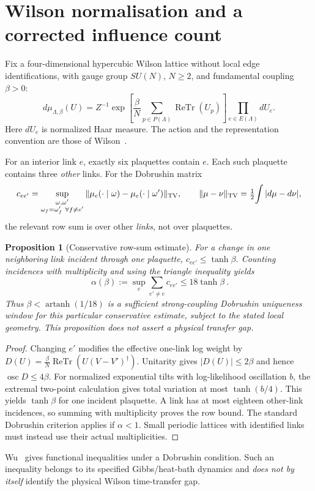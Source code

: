 \documentclass[11pt,a4paper]{article}
\newtheorem{proposition}[theorem]{Proposition}
\theoremstyle{remark}
\begin{document}
\section{Wilson normalisation and a corrected influence count}
Fix a four-dimensional hypercubic Wilson lattice without local
edge identifications, with gauge group $SU(N)$, $N\ge2$, and
fundamental coupling $\beta>0$:
\[
d\mu_{\Lambda,\beta}(U)=
Z^{-1}\exp\left[
  \frac{\beta}{N}\sum_{p\in P(\Lambda)}
      \operatorname{ReTr}(U_p)
\right]\prod_{e\in E(\Lambda)}dU_e.
\]
Here $dU_e$ is normalized Haar measure.
The action and the representation convention are those of
Wilson~\cite{Wilson}.

For an interior link $e$, exactly six plaquettes contain $e$.
Each such plaquette contains three \emph{other} links.
For the Dobrushin matrix
\[
c_{ee'}=\sup_{\substack{\omega,\omega'\\
\omega_f=\omega'_f\ \forall f\ne e'}}
\|\mu_e(\cdot\mid\omega)-\mu_e(\cdot\mid\omega')\|_{\rm TV},
\qquad \|\mu-\nu\|_{\rm TV}=\tfrac12\!\int|d\mu-d\nu|,
\]
the relevant row sum is over other \emph{links}, not over
plaquettes.

\begin{proposition}[Conservative row-sum estimate]\label{prop:count}
For a change in one neighboring link incident through one
plaquette, $c_{ee'}\le\tanh\beta$.
Counting incidences with multiplicity and using the triangle
inequality yields
\[
\boxed{\ \alpha(\beta):=\sup_e\sum_{e'\ne e}c_{ee'}
\le18\tanh\beta\ }.
\]
Thus $\beta<\operatorname{artanh}(1/18)$ is a sufficient
strong-coupling \emph{Dobrushin uniqueness} window for this
particular conservative estimate, subject to the stated local
geometry. This proposition does not assert a physical transfer gap.
\end{proposition}
\begin{proof}
Changing $e'$ modifies the effective one-link log weight by
$D(U)=\frac{\beta}{N}\operatorname{ReTr}(U(V-V')^\dagger)$.
Unitarity gives $|D(U)|\le2\beta$ and hence
$\operatorname{osc}D\le4\beta$.
For normalized exponential tilts with log-likelihood oscillation
$b$, the extremal two-point calculation gives total variation at
most $\tanh(b/4)$. This yields $\tanh\beta$ for one incident
plaquette. A link has at most eighteen other-link incidences, so
summing with multiplicity proves the row bound.
The standard Dobrushin criterion applies if $\alpha<1$.
Small periodic lattices with identified links must instead
use their actual multiplicities.
\end{proof}
Wu~\cite{Wu} gives functional inequalities under a Dobrushin
condition. Such an inequality belongs to its specified
Gibbs/heat-bath dynamics and \emph{does not by itself} identify the
physical Wilson time-transfer gap.
\end{document}
